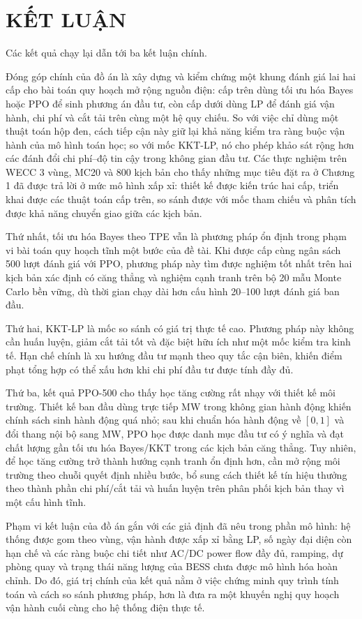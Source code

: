 \chapter*{KẾT LUẬN}
\label{chap:conclusion}

Các kết quả chạy lại dẫn tới ba kết luận chính.

Đóng góp chính của đồ án là xây dựng và kiểm chứng một khung đánh giá lai hai cấp cho bài toán quy hoạch mở rộng nguồn điện: cấp trên dùng tối ưu hóa Bayes hoặc PPO để sinh phương án đầu tư, còn cấp dưới dùng LP để đánh giá vận hành, chi phí và cắt tải trên cùng một hệ quy chiếu. So với việc chỉ dùng một thuật toán hộp đen, cách tiếp cận này giữ lại khả năng kiểm tra ràng buộc vận hành của mô hình toán học; so với mốc KKT-LP, nó cho phép khảo sát rộng hơn các đánh đổi chi phí--độ tin cậy trong không gian đầu tư. Các thực nghiệm trên WECC 3 vùng, MC20 và 800 kịch bản cho thấy những mục tiêu đặt ra ở Chương 1 đã được trả lời ở mức mô hình xấp xỉ: thiết kế được kiến trúc hai cấp, triển khai được các thuật toán cấp trên, so sánh được với mốc tham chiếu và phân tích được khả năng chuyển giao giữa các kịch bản.

Thứ nhất, tối ưu hóa Bayes theo TPE vẫn là phương pháp ổn định trong phạm vi bài toán quy hoạch tĩnh một bước của đề tài. Khi được cấp cùng ngân sách 500 lượt đánh giá với PPO, phương pháp này tìm được nghiệm tốt nhất trên hai kịch bản xác định có căng thẳng và nghiệm cạnh tranh trên bộ 20 mẫu Monte Carlo bền vững, dù thời gian chạy dài hơn cấu hình 20--100 lượt đánh giá ban đầu.

Thứ hai, KKT-LP là mốc so sánh có giá trị thực tế cao. Phương pháp này không cần huấn luyện, giảm cắt tải tốt và đặc biệt hữu ích như một mốc kiểm tra kinh tế. Hạn chế chính là xu hướng đầu tư mạnh theo quy tắc cận biên, khiến điểm phạt tổng hợp có thể xấu hơn khi chi phí đầu tư được tính đầy đủ.

Thứ ba, kết quả PPO-500 cho thấy học tăng cường rất nhạy với thiết kế môi trường. Thiết kế ban đầu dùng trực tiếp MW trong không gian hành động khiến chính sách sinh hành động quá nhỏ; sau khi chuẩn hóa hành động về $[0,1]$ và đổi thang nội bộ sang MW, PPO học được danh mục đầu tư có ý nghĩa và đạt chất lượng gần tối ưu hóa Bayes/KKT trong các kịch bản căng thẳng. Tuy nhiên, để học tăng cường trở thành hướng cạnh tranh ổn định hơn, cần mở rộng môi trường theo chuỗi quyết định nhiều bước, bổ sung cách thiết kế tín hiệu thưởng theo thành phần chi phí/cắt tải và huấn luyện trên phân phối kịch bản thay vì một cấu hình tĩnh.

Phạm vi kết luận của đồ án gắn với các giả định đã nêu trong phần mô hình: hệ thống được gom theo vùng, vận hành được xấp xỉ bằng LP, số ngày đại diện còn hạn chế và các ràng buộc chi tiết như AC/DC power flow đầy đủ, ramping, dự phòng quay và trạng thái năng lượng của BESS chưa được mô hình hóa hoàn chỉnh. Do đó, giá trị chính của kết quả nằm ở việc chứng minh quy trình tính toán và cách so sánh phương pháp, hơn là đưa ra một khuyến nghị quy hoạch vận hành cuối cùng cho hệ thống điện thực tế.
